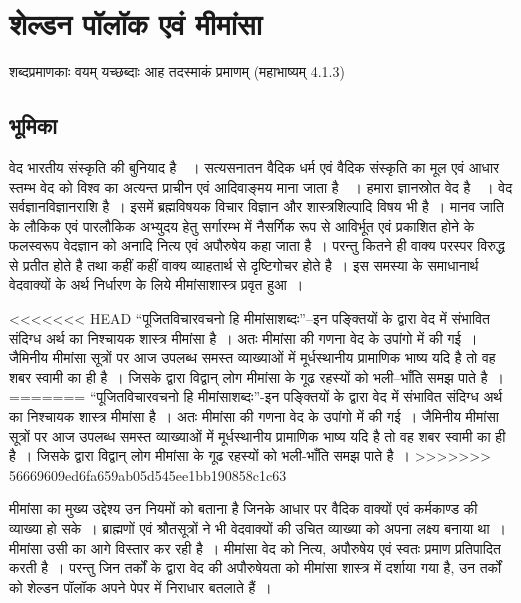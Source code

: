 
\chapter{शेल्डन पॉलॉक एवं मीमांसा}\label{chapter1}


\bgroup

\selectdev

\medskip

\centerline{शब्दप्रमाणकाः वयम् यच्छब्दाः आह तदस्माकं प्रमाणम् (महाभाष्यम् 4.1.3)}


\section*{भूमिका}

वेद भारतीय संस्कृति की बुनियाद है~~। सत्यसनातन वैदिक धर्म एवं वैदिक संस्कृति का मूल एवं आधार स्तम्भ वेद को विश्व का अत्यन्त प्राचीन एवं आदिवाङ्मय माना जाता है~~। हमारा ज्ञानस्रोत वेद है~~। वेद सर्वज्ञानविज्ञानराशि है~। इसमें ब्रह्मविषयक विचार विज्ञान और शास्त्रशिल्पादि विषय भी है~। मानव जाति के लौकिक एवं पारलौकिक अभ्युदय हेतु सर्गारम्भ में नैसर्गिक रूप से आविर्भूत एवं प्रकाशित होने के फलस्वरूप वेदज्ञान को अनादि नित्य एवं अपौरुषेय कहा जाता है~। परन्तु कितने ही वाक्य परस्पर विरुद्ध से प्रतीत होते है तथा कहीं कहीं वाक्य व्याहतार्थ से दृष्टिगोचर होते है~। इस समस्या के समाधानार्थ वेदवाक्यों के अर्थ निर्धारण के लिये मीमांसाशास्त्र प्रवृत हुआ~।

<<<<<<< HEAD
“पूजितविचारवचनो हि मीमांसाशब्दः”–इन पङ्क्तियों के द्वारा वेद में संभावित संदिग्ध अर्थ का निश्चायक शास्त्र मीमांसा है~। अतः मीमांसा की गणना वेद के उपांगो में की गई~। जैमिनीय मीमांसा सूत्रों पर आज उपलब्ध समस्त व्याख्याओं में मूर्धस्थानीय प्रामाणिक भाष्य यदि है तो वह शबर स्वामी का ही है~। जिसके द्वारा विद्वान् लोग मीमांसा के गूढ रहस्यों को भली–भाँति समझ पाते है~। 
=======
“पूजितविचारवचनो हि मीमांसाशब्दः”-इन पङ्क्तियों के द्वारा वेद में संभावित संदिग्ध अर्थ का निश्चायक शास्त्र मीमांसा है~। अतः मीमांसा की गणना वेद के उपांगो में की गई~। जैमिनीय मीमांसा सूत्रों पर आज उपलब्ध समस्त व्याख्याओं में मूर्धस्थानीय प्रामाणिक भाष्य यदि है तो वह शबर स्वामी का ही है~। जिसके द्वारा विद्वान् लोग मीमांसा के गूढ रहस्यों को भली-भाँति समझ पाते है~। 
>>>>>>> 56669609ed6fa659ab05d545ee1bb190858c1c63

मीमांसा का मुख्य उद्देश्य उन नियमों को बताना है जिनके आधार पर वैदिक वाक्यों एवं कर्मकाण्ड की व्याख्या हो सके~। ब्राह्मणों एवं श्रौतसूत्रों ने भी वेदवाक्यों की उचित व्याख्या को अपना लक्ष्य बनाया था~। मीमांसा उसी का आगे विस्तार कर रही है~। मीमांसा वेद को नित्य, अपौरुषेय एवं स्वतः प्रमाण प्रतिपादित करती है~। परन्तु जिन तर्कों के द्वारा वेद की अपौरुषेयता को मीमांसा शास्त्र में दर्शाया गया है, उन तर्कों को शेल्डन पॉलॉक अपने पेपर  में निराधार बतलाते हैं~।

